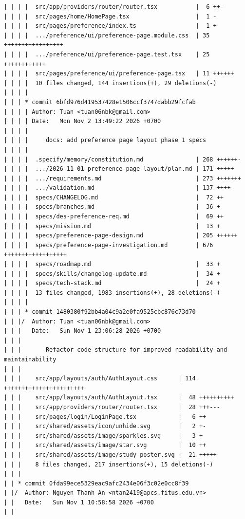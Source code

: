 \documentclass[12pt]{article}
\begin{document}
\begin{lstlisting}[numbers=none,breaklines=true]
| | | |  src/app/providers/router/router.tsx           |  6 ++-
| | | |  src/pages/home/HomePage.tsx                   |  1 -
| | | |  src/pages/preference/index.ts                 |  1 +
| | | |  .../preference/ui/preference-page.module.css  | 35 +++++++++++++++++
| | | |  .../preference/ui/preference-page.test.tsx    | 25 ++++++++++++
| | | |  src/pages/preference/ui/preference-page.tsx   | 11 ++++++
| | | |  10 files changed, 144 insertions(+), 29 deletions(-)
| | | |
| | | * commit 6bfd976d419537428e1506ccf3747dabb29fcfab
| | | | Author: Tuan <tuan06nbk@gmail.com>
| | | | Date:   Mon Nov 2 13:49:22 2026 +0700
| | | |
| | | |     docs: add preference page layout phase 1 specs
| | | |
| | | |  .specify/memory/constitution.md               | 268 ++++++-
| | | |  .../2026-11-01-preference-page-layout/plan.md | 171 +++++
| | | |  .../requirements.md                           | 273 +++++++
| | | |  .../validation.md                             | 137 ++++
| | | |  specs/CHANGELOG.md                            |  72 ++
| | | |  specs/branches.md                             |  36 +
| | | |  specs/des-preference-req.md                   |  69 ++
| | | |  specs/mission.md                              |  13 +
| | | |  specs/preference-page-design.md               | 205 ++++++
| | | |  specs/preference-page-investigation.md        | 676 ++++++++++++++++++
| | | |  specs/roadmap.md                              |  33 +
| | | |  specs/skills/changelog-update.md              |  34 +
| | | |  specs/tech-stack.md                           |  24 +
| | | |  13 files changed, 1983 insertions(+), 28 deletions(-)
| | | |
| | | * commit 1480380f92bb4a04c9a2e0fa9525cbc876c73d70
| | |/  Author: Tuan <tuan06nbk@gmail.com>
| | |   Date:   Sun Nov 1 23:06:28 2026 +0700
| | |
| | |       Refactor code structure for improved readability and maintainability
| | |
| | |    src/app/layouts/auth/AuthLayout.css      | 114 +++++++++++++++++++++++
| | |    src/app/layouts/auth/AuthLayout.tsx      |  48 ++++++++++
| | |    src/app/providers/router/router.tsx      |  28 +++---
| | |    src/pages/login/LoginPage.tsx            |   6 ++
| | |    src/shared/assets/icon/unhide.svg        |   2 +-
| | |    src/shared/assets/image/sparkles.svg     |   3 +
| | |    src/shared/assets/image/star.svg         |  10 ++
| | |    src/shared/assets/image/study-poster.svg |  21 +++++
| | |    8 files changed, 217 insertions(+), 15 deletions(-)
| | |
| | * commit 0fda99ece5329eac9afc2434e06f3c02e0cc8f39
| |/  Author: Nguyen Thanh An <ntan2419@apcs.fitus.edu.vn>
| |   Date:   Sun Nov 1 10:58:58 2026 +0700
| |

\end{lstlisting}
\end{document}
